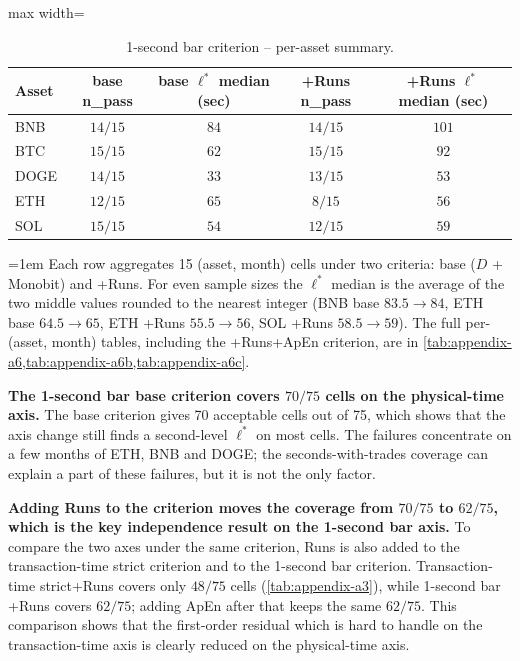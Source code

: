 \documentclass[11pt,titlepage,openany,oneside]{book}  %
\newcommand{\floatnote}[1]{%
  \par\smallskip\noindent%
  \begin{minipage}{\linewidth}%
    \footnotesize\emergencystretch=1em #1%
  \end{minipage}\par%
}
\begin{document}
\begin{table}[!htb]
  \caption{1-second bar criterion -- per-asset summary.}
  \label{tab:exp2-1sbars-summary}
  \begin{center}
    \begin{adjustbox}{max width=\textwidth}
    \begin{tabular}{lcccc}
      \toprule
      Asset & base n\_pass & base $\ell^*$ median (sec) & +Runs n\_pass & +Runs $\ell^*$ median (sec) \\
      \midrule
      BNB  & $14/15$ & $84$ & $14/15$ & $101$ \\
      BTC  & $15/15$ & $62$ & $15/15$ & $92$  \\
      DOGE & $14/15$ & $33$ & $13/15$ & $53$  \\
      ETH  & $12/15$ & $65$ & $8/15$  & $56$  \\
      SOL  & $15/15$ & $54$ & $12/15$ & $59$  \\
      \bottomrule
    \end{tabular}
    \end{adjustbox}
  \end{center}
  \floatnote{Each row aggregates 15 (asset, month) cells under two criteria: base ($D$ + Monobit) and +Runs. For even sample sizes the $\ell^*$ median is the average of the two middle values rounded to the nearest integer (BNB base $83.5 \to 84$, ETH base $64.5 \to 65$, ETH +Runs $55.5 \to 56$, SOL +Runs $58.5 \to 59$). The full per-(asset, month) tables, including the +Runs+ApEn criterion, are in \cref{tab:appendix-a6,tab:appendix-a6b,tab:appendix-a6c}.}
\end{table}

\textbf{The 1-second bar base criterion covers $70/75$ cells on the physical-time axis.} The base criterion gives 70 acceptable cells out of 75, which shows that the axis change still finds a second-level $\ell^*$ on most cells. The failures concentrate on a few months of ETH, BNB and DOGE; the seconds-with-trades coverage can explain a part of these failures, but it is not the only factor.

\textbf{Adding Runs to the criterion moves the coverage from $70/75$ to $62/75$, which is the key independence result on the 1-second bar axis.} To compare the two axes under the same criterion, Runs is also added to the transaction-time strict criterion and to the 1-second bar criterion. Transaction-time strict+Runs covers only $48/75$ cells (\cref{tab:appendix-a3}), while 1-second bar +Runs covers $62/75$; adding ApEn after that keeps the same $62/75$. This comparison shows that the first-order residual which is hard to handle on the transaction-time axis is clearly reduced on the physical-time axis.
\end{document}
